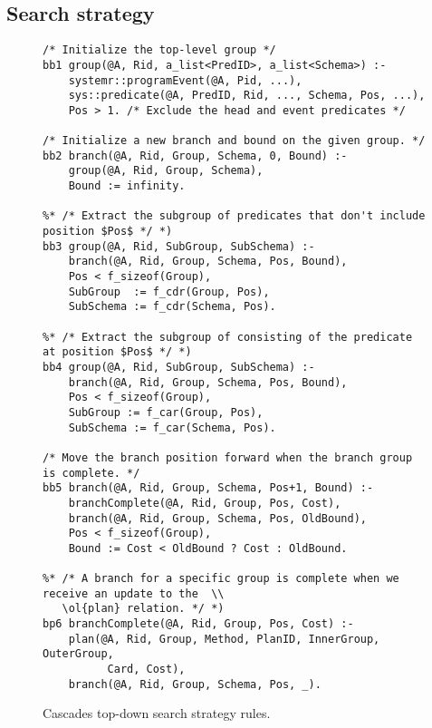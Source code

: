\subsection{Search strategy}
\label{ch:opt:sec:cascades_search}

\begin{figure*}
\ssp
\centering
\begin{lstlisting}
/* Initialize the top-level group */
bb1 group(@A, Rid, a_list<PredID>, a_list<Schema>) :-
    systemr::programEvent(@A, Pid, ...),
    sys::predicate(@A, PredID, Rid, ..., Schema, Pos, ...),
    Pos > 1. /* Exclude the head and event predicates */

/* Initialize a new branch and bound on the given group. */
bb2 branch(@A, Rid, Group, Schema, 0, Bound) :-
    group(@A, Rid, Group, Schema),
    Bound := infinity.

%* /* Extract the subgroup of predicates that don't include position $Pos$ */ *)
bb3 group(@A, Rid, SubGroup, SubSchema) :-
    branch(@A, Rid, Group, Schema, Pos, Bound),
    Pos < f_sizeof(Group),
    SubGroup  := f_cdr(Group, Pos),
    SubSchema := f_cdr(Schema, Pos).

%* /* Extract the subgroup of consisting of the predicate at position $Pos$ */ *)
bb4 group(@A, Rid, SubGroup, SubSchema) :-
    branch(@A, Rid, Group, Schema, Pos, Bound),
    Pos < f_sizeof(Group),
    SubGroup := f_car(Group, Pos),
    SubSchema := f_car(Schema, Pos).

/* Move the branch position forward when the branch group is complete. */
bb5 branch(@A, Rid, Group, Schema, Pos+1, Bound) :-
    branchComplete(@A, Rid, Group, Pos, Cost),
    branch(@A, Rid, Group, Schema, Pos, OldBound),
    Pos < f_sizeof(Group),
    Bound := Cost < OldBound ? Cost : OldBound.

%* /* A branch for a specific group is complete when we receive an update to the  \\
   \ol{plan} relation. */ *)
bp6 branchComplete(@A, Rid, Group, Pos, Cost) :-
    plan(@A, Rid, Group, Method, PlanID, InnerGroup, OuterGroup, 
          Card, Cost),
    branch(@A, Rid, Group, Schema, Pos, _).
\end{lstlisting}
\caption{\label{ch:opt:fig:cascades_top_down} Cascades top-down search strategy rules.}
\end{figure*}

